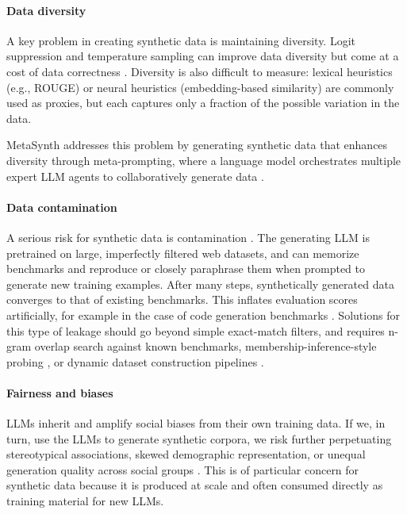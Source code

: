 \paragraph{Data diversity}
A key problem in creating synthetic data is maintaining diversity. Logit suppression and temperature sampling can improve data diversity but come at a cost of data correctness \citep{chung-etal-2023-increasing}. Diversity is also difficult to measure: lexical heuristics (e.g., ROUGE) or neural heuristics (embedding-based similarity) are commonly used as proxies, but each captures only a fraction of the possible variation in the data. 

MetaSynth addresses this problem by generating synthetic data that enhances diversity through meta-prompting, where a language model orchestrates multiple expert LLM agents to collaboratively generate data \citep{riaz-etal-2025-metasynth}.


\paragraph{Data contamination}
A serious risk for synthetic data is contamination \citep{deng-etal-2024-unveiling, balloccu-etal-2024-leak}. The generating LLM is  pretrained on large, imperfectly filtered web datasets, and can memorize benchmarks and reproduce or closely paraphrase them when prompted to generate new training examples.
After many steps, synthetically generated data converges to that of existing benchmarks. This  inflates evaluation scores artificially, for example in the case of code generation benchmarks \citep{matton-etal-2024-leakage}. Solutions for this type of leakage should  go beyond simple exact-match filters, and  requires n-gram overlap search against known benchmarks, membership-inference-style probing \citep{puerto-etal-2025-scaling, huang-etal-2026-robust}, or dynamic dataset construction pipelines \citep{chen-etal-2025-benchmarking-large}.

\paragraph{Fairness and biases}
LLMs inherit and amplify social biases from their own training data. If we, in turn, use the LLMs to generate synthetic corpora, we risk further perpetuating stereotypical associations, skewed demographic representation, or unequal generation quality across social groups \citep{gallegos2024bias}. This is of particular concern for synthetic data because it is produced at scale and often consumed directly as training material for new LLMs.

